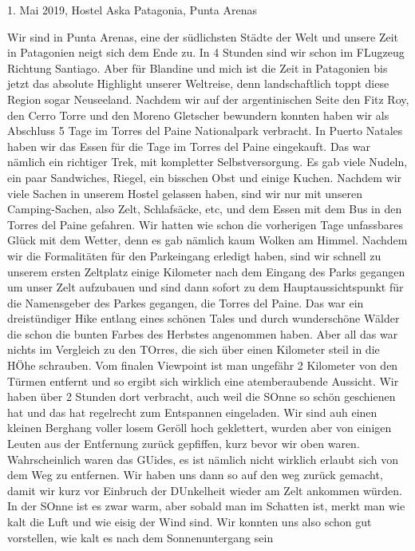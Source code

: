 \documentclass[11pt]{book}
\begin{document}
1. Mai 2019, Hostel Aska Patagonia, Punta Arenas

Wir sind in Punta Arenas, eine der südlichsten Städte der Welt und unsere Zeit in Patagonien neigt sich dem Ende zu. In 4 Stunden 
sind wir schon im FLugzeug Richtung Santiago. Aber für Blandine und mich ist die Zeit in Patagonien bis jetzt das absolute Highlight 
unserer Weltreise, denn landschaftlich toppt diese Region sogar Neuseeland. Nachdem wir auf der argentinischen Seite den Fitz Roy, 
den Cerro Torre und den Moreno Gletscher bewundern konnten haben wir als Abschluss 5 Tage im Torres del Paine Nationalpark verbracht. 
In Puerto Natales haben wir das Essen für die Tage im Torres del Paine eingekauft. Das war nämlich ein richtiger Trek, mit kompletter 
Selbstversorgung. Es gab viele Nudeln, ein paar Sandwiches, Riegel, ein bisschen Obst und einige Kuchen. Nachdem wir viele Sachen 
in unserem Hostel gelassen haben, sind wir nur mit unseren Camping-Sachen, also Zelt, Schlafsäcke, etc, und dem Essen mit dem 
Bus in den Torres del Paine gefahren. Wir hatten wie schon die vorherigen Tage unfassbares Glück mit dem Wetter, denn es gab nämlich 
kaum Wolken am Himmel. Nachdem wir die Formalitäten für den Parkeingang erledigt haben, sind wir schnell zu unserem ersten Zeltplatz 
einige Kilometer nach dem Eingang des Parks gegangen um unser Zelt aufzubauen und sind dann sofort zu dem Hauptaussichtspunkt für die 
Namensgeber des Parkes gegangen, die Torres del Paine. Das war ein dreistündiger Hike entlang eines schönen Tales und durch wunderschöne 
Wälder die schon die bunten Farbes des Herbstes angenommen haben. Aber all das war nichts im Vergleich zu den TOrres, die sich 
über einen Kilometer steil in die HÖhe schrauben. Vom finalen Viewpoint ist man ungefähr 2 Kilometer von den Türmen entfernt und 
so ergibt sich wirklich eine atemberaubende Aussicht. Wir haben über 2 Stunden dort verbracht, auch weil die SOnne so schön 
geschienen hat und das hat regelrecht zum Entspannen eingeladen. Wir sind auh einen kleinen Berghang voller losem Geröll hoch geklettert, 
wurden aber von einigen Leuten aus der Entfernung zurück gepfiffen, kurz bevor wir oben waren. Wahrscheinlich waren das GUides, es ist 
nämlich nicht wirklich erlaubt sich von dem Weg zu entfernen. Wir haben uns dann so auf den weg zurück gemacht, damit wir kurz vor 
Einbruch der DUnkelheit wieder am Zelt ankommen würden. In der SOnne ist es zwar warm, aber sobald man im Schatten ist, merkt man 
wie kalt die Luft und wie eisig der Wind sind. Wir konnten uns also schon gut vorstellen, wie kalt es nach dem Sonnenuntergang sein 
\end{document}
